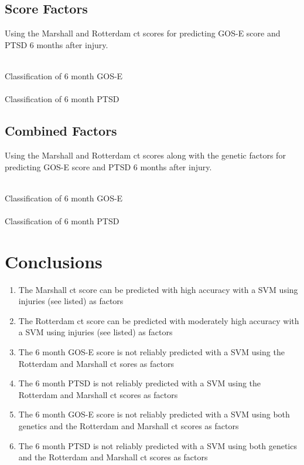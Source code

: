 \documentclass[11pt]{article}
\begin{document}
\subsection{Score Factors}
Using the Marshall and Rotterdam \gls{ct} scores for predicting GOS-E score and PTSD 6 months after injury.\\
\\
\begin{center}
  \Large{Classification of 6 month GOS-E}\\
  \\
  \Large{Classification of 6 month PTSD}\\
\end{center}

\subsection{Combined Factors}
Using the Marshall and Rotterdam \gls{ct} scores along with the genetic factors for predicting GOS-E score and PTSD 6 months after injury.\\
\\
\begin{center}
  \Large{Classification of 6 month GOS-E}\\
  \\
  \Large{Classification of 6 month PTSD}\\
\end{center}

\section{Conclusions}

\begin{enumerate}
  \item{The Marshall \gls{ct} score can be predicted with high accuracy with a SVM using injuries (see listed) as factors}
  \item{The Rotterdam \gls{ct} score can be predicted with moderately high accuracy with a SVM using injuries (see listed) as factors}
  \item{The 6 month GOS-E score is not reliably predicted with a SVM using the Rotterdam and Marshall \gls{ct} sores as factors}
  \item{The 6 month PTSD is not reliably predicted with a SVM using the Rotterdam and Marshall \gls{ct} scores as factors}
  \item{The 6 month GOS-E score is not reliably predicted with a SVM using both genetics and the Rotterdam and Marshall \gls{ct} scores as factors}
  \item{The 6 month PTSD is not reliably predicted with a SVM using both genetics and the Rotterdam and Marshall \gls{ct} scores as factors}
\end{enumerate}
\end{document}
